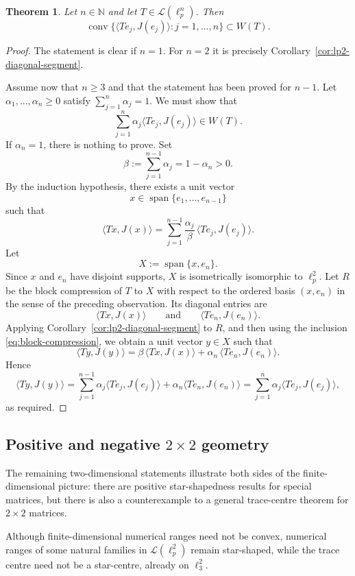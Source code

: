 \documentclass[11pt]{amsart}
\numberwithin{equation}{section}
\newtheorem{theorem}{Theorem}[section]
\theoremstyle{definition}
\theoremstyle{remark}
\DeclareMathOperator{\conv}{conv}
\newcommand{\N}{\mathbb{N}}
\newcommand{\ip}[2]{\langle #1,#2\rangle}
\begin{document}
\begin{theorem}\label{thm:finite-diagonal-convexity}
Let $n\in\N$ and let $T\in \mathcal L(\ell_p^n)$. Then
\[
\conv\bigl\{\ip{Te_j}{J(e_j)}: j=1,\dots,n\bigr\}\subset W(T).
\]
\end{theorem}

\begin{proof}
The statement is clear if $n=1$. For $n=2$ it is precisely Corollary~\ref{cor:lp2-diagonal-segment}.

Assume now that $n\ge 3$ and that the statement has been proved for $n-1$.
Let $\alpha_1,\dots,\alpha_n\ge 0$ satisfy $\sum_{j=1}^n \alpha_j=1$.
We must show that
\[
\sum_{j=1}^n \alpha_j\ip{Te_j}{J(e_j)}\in W(T).
\]
If $\alpha_n=1$, there is nothing to prove. Set
\[
\beta:=\sum_{j=1}^{n-1}\alpha_j=1-\alpha_n>0.
\]
By the induction hypothesis, there exists a unit vector
\[
x\in \operatorname{span}\{e_1,\dots,e_{n-1}\}
\]
such that
\[
\ip{Tx}{J(x)}=\sum_{j=1}^{n-1}\frac{\alpha_j}{\beta}\,\ip{Te_j}{J(e_j)}.
\]
Let
\[
X:=\operatorname{span}\{x,e_n\}.
\]
Since $x$ and $e_n$ have disjoint supports, $X$ is isometrically isomorphic to $\ell_p^2$. Let $R$ be the block compression of $T$ to $X$ with respect to the ordered basis $(x,e_n)$ in the sense of the preceding observation. Its diagonal entries are
\[
\ip{Tx}{J(x)}
\qquad\text{and}\qquad
\ip{Te_n}{J(e_n)}.
\]
Applying Corollary~\ref{cor:lp2-diagonal-segment} to $R$, and then using the inclusion \eqref{eq:block-compression},
we obtain a unit vector $y\in X$ such that
\[
\ip{Ty}{J(y)}=\beta\,\ip{Tx}{J(x)}+\alpha_n\,\ip{Te_n}{J(e_n)}.
\]
Hence
\[
\ip{Ty}{J(y)}=\sum_{j=1}^{n-1}\alpha_j\ip{Te_j}{J(e_j)}+\alpha_n\ip{Te_n}{J(e_n)}=\sum_{j=1}^{n}\alpha_j\ip{Te_j}{J(e_j)},
\]
as required.
\end{proof}


\subsection{Positive and negative $2\times2$ geometry}
\leavevmode\par

The remaining two-dimensional statements illustrate both sides of the finite-dimensional picture: there are positive star-shapedness results for special matrices, but
there is also a counterexample to a general trace-centre theorem
for $2\times2$ matrices.

Although finite-dimensional numerical ranges need not be convex, numerical ranges of some natural families in $\mathcal L(\ell_p^2)$ remain star-shaped, while the trace centre need not be a star-centre, already on $\ell_3^2$.
\end{document}
